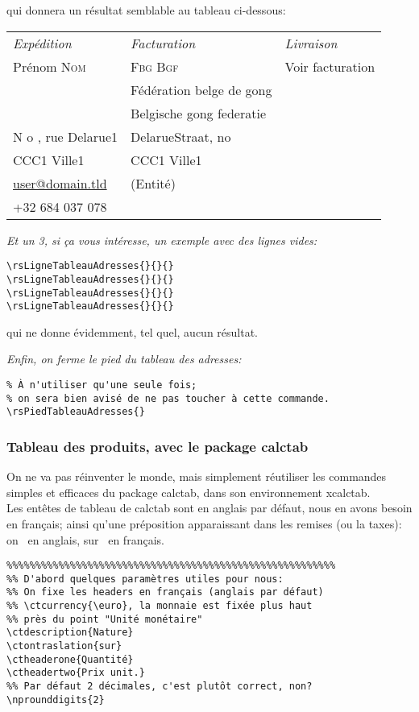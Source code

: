\documentclass[a4paper,10pt]{article}
\begin{document}
qui donnera un résultat semblable au tableau ci-dessous:
\begin{flushleft}
\begin{tabular}{p{}p{}p{}}
\hline
 \emph{Expédition} & \emph{Facturation} & \emph{Livraison} \\
 Prénom \textsc{Nom} & \textsc{Fbg Bgf} & Voir facturation \\
  & Fédération belge de gong &  \\
  & Belgische gong federatie &  \\
 N o , rue Delarue1 & DelarueStraat, no &  \\
 CCC1 Ville1 & CCC1 Ville1 &  \\
 \href{mailto:user@domain.tld}{user@domain.tld} & (Entité) &  \\
 +32 684 037 078 &  &  \\ 
\hline
\end{tabular}
\end{flushleft}


\emph{Et un 3, si ça vous intéresse, un exemple avec des lignes vides:}
\begin{lstlisting}
\rsLigneTableauAdresses{}{}{}
\rsLigneTableauAdresses{}{}{}
\rsLigneTableauAdresses{}{}{}
\rsLigneTableauAdresses{}{}{}
\end{lstlisting}
qui ne donne évidemment, tel quel, aucun résultat.


\emph{Enfin, on ferme le pied du tableau des adresses:}
\begin{lstlisting}
% À n'utiliser qu'une seule fois; 
% on sera bien avisé de ne pas toucher à cette commande.
\rsPiedTableauAdresses{}
\end{lstlisting}

\subsubsection{Tableau des produits, avec le package calctab}

On ne va pas réinventer le monde, mais simplement réutiliser les commandes
simples et efficaces du package calctab, dans son environnement xcalctab. 
\\
Les entêtes de tableau de calctab sont en anglais par défaut, 
 nous en avons besoin en français; ainsi qu'une préposition apparaissant dans les remises (ou la taxes): \og on \fg\ en anglais, \og sur \fg\ en français.
 
\begin{lstlisting}
%%%%%%%%%%%%%%%%%%%%%%%%%%%%%%%%%%%%%%%%%%%%%%%%%%%%%%%%%
%% D'abord quelques paramètres utiles pour nous:
%% On fixe les headers en français (anglais par défaut)
%% \ctcurrency{\euro}, la monnaie est fixée plus haut
%% près du point "Unité monétaire"
\ctdescription{Nature}
\ctontraslation{sur}
\ctheaderone{Quantité}
\ctheadertwo{Prix unit.}
%% Par défaut 2 décimales, c'est plutôt correct, non?
\nprounddigits{2}
\end{lstlisting}
\end{document}
